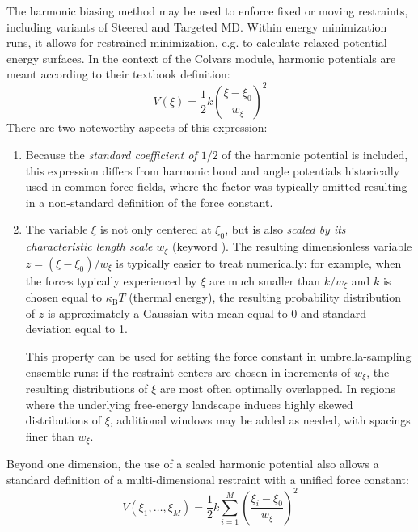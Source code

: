 
The harmonic biasing method may be used to enforce fixed or moving restraints,
including variants of Steered and Targeted MD. Within energy minimization
runs, it allows for restrained minimization, e.g. to calculate relaxed potential
energy surfaces. In the context of the Colvars module,
harmonic potentials are meant according to their textbook definition:
\begin{equation}
  \label{eq:colvarbias_harmonic}
  V(\xi) = \frac{1}{2} k \left(\frac{\xi - \xi_0}{w_{\xi}}\right)^2
\end{equation}
There are two noteworthy aspects of this expression:
\begin{enumerate}
\item Because the \emph{standard coefficient of $1/2$} of the harmonic potential is included, this expression differs from harmonic bond and angle potentials historically used in common force fields, where the factor was typically omitted resulting in a non-standard definition of the force constant.
\item The variable $\xi$ is not only centered at $\xi_0$, but is also \emph{scaled by its characteristic length scale} $w_{\xi}$ (keyword ).
  The resulting dimensionless variable $z = (\xi - \xi_0)/w_{\xi}$ is typically easier to treat numerically: for example, when the forces typically experienced by $\xi$ are much smaller than $k/w_{\xi}$ and $k$ is chosen equal to $\kappa_{\mathrm{B}}T$ (thermal energy), the resulting probability distribution of $z$ is approximately a Gaussian with mean equal to 0 and standard deviation equal to 1.

  This property can be used for setting the force constant in umbrella-sampling ensemble runs: if the restraint centers are chosen in increments of $w_{\xi}$, the resulting distributions of $\xi$ are most often optimally overlapped.
  In regions where the underlying free-energy landscape induces highly skewed distributions of $\xi$, additional windows may be added as needed, with spacings finer than $w_{\xi}$.
\end{enumerate}

Beyond one dimension, the use of a scaled harmonic potential also allows a standard definition of a multi-dimensional restraint with a unified force constant:
\begin{equation}
  \label{eq:colvarbias_harmonic_multi}
  V(\xi_{1}, \ldots, \xi_{M}) = \frac{1}{2} k \sum_{i=1}^{M} \left(\frac{\xi_{i} - \xi_0}{w_{\xi}}\right)^2
\end{equation}

